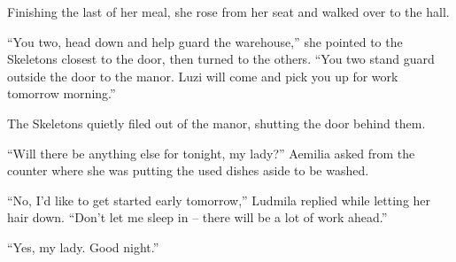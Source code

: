  

Finishing the last of her meal, she rose from her seat and walked over to the hall.

 

“You two, head down and help guard the warehouse,” she pointed to the Skeletons closest to the door, then turned to the others. “You two stand guard outside the door to the manor. Luzi will come and pick you up for work tomorrow morning.”

 

The Skeletons quietly filed out of the manor, shutting the door behind them.

 

“Will there be anything else for tonight, my lady?” Aemilia asked from the counter where she was putting the used dishes aside to be washed.

 

“No, I’d like to get started early tomorrow,” Ludmila replied while letting her hair down. “Don’t let me sleep in – there will be a lot of work ahead.”

 

“Yes, my lady. Good night.”